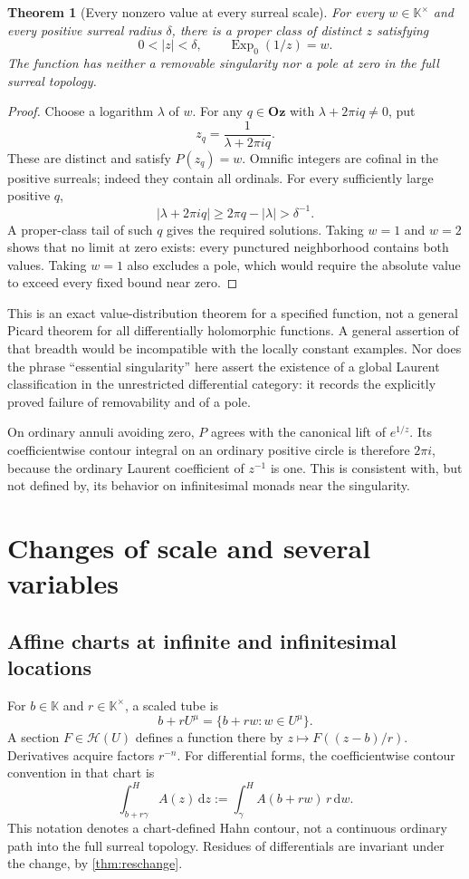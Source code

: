 \documentclass[11pt,oneside]{article}
\numberwithin{equation}{section}
\newtheorem{theorem}{Theorem}[section]
\theoremstyle{definition}
\theoremstyle{remark}\newtheorem{remark}[theorem]{Remark}
\newcommand{\Oz}{\mathbf{Oz}}
\newcommand{\K}{\mathbb K}
\newcommand{\HH}{\mathscr H}
\newcommand{\Exp}{\operatorname{Exp}}
\newcommand{\hint}{\mathop{\int}\nolimits^{\!H}}
\newcommand{\dd}{\,\mathrm d}
\begin{document}
\begin{theorem}[Every nonzero value at every surreal scale]\label{thm:picard}
For every $w\in\K^\times$ and every positive surreal radius $\delta$,
there is a proper class of distinct $z$ satisfying
\[
 0<|z|<\delta,\qquad \Exp_0(1/z)=w.
\]
The function has neither a removable singularity nor a pole at zero in
the full surreal topology.
\end{theorem}
\begin{proof}
Choose a logarithm $\lambda$ of $w$. For any $q\in\Oz$ with
$\lambda+2\pi iq\ne0$, put
\[
 z_q=\frac1{\lambda+2\pi iq}.
\]
These are distinct and satisfy $P(z_q)=w$. Omnific integers are cofinal
in the positive surreals; indeed they contain all ordinals. For every
sufficiently large positive $q$,
\[
 |\lambda+2\pi iq|\geq2\pi q-|\lambda|>\delta^{-1}.
\]
A proper-class tail of such $q$ gives the required solutions.
Taking $w=1$ and $w=2$ shows that no limit at zero exists: every punctured
neighborhood contains both values. Taking $w=1$ also excludes a pole,
which would require the absolute value to exceed every fixed bound near
zero.
\end{proof}
This is an exact value-distribution theorem for a specified function,
not a general Picard theorem for all differentially holomorphic functions.
A general assertion of that breadth would be incompatible with the
locally constant examples. Nor does the phrase ``essential singularity''
here assert the existence of a global Laurent classification in the
unrestricted differential category: it records the explicitly proved
failure of removability and of a pole.

On ordinary annuli avoiding zero, $P$ agrees with the canonical lift of
$e^{1/z}$. Its coefficientwise contour integral on an ordinary positive
circle is therefore $2\pi i$, because the ordinary Laurent coefficient
of $z^{-1}$ is one. This is consistent with, but not defined by, its
behavior on infinitesimal monads near the singularity.

\section{Changes of scale and several variables}
\subsection{Affine charts at infinite and infinitesimal locations}
For $b\in\K$ and $r\in\K^\times$, a scaled tube is
\[
 b+rU^\mu=\{b+rw:w\in U^\mu\}.
\]
A section $F\in\HH(U)$ defines a function there by $z\mapsto F((z-b)/r)$.
Derivatives acquire factors $r^{-n}$. For differential forms, the
coefficientwise contour convention in that chart is
\[
 \hint_{b+r\gamma} A(z)\dd z
 :=\hint_\gamma A(b+rw)\,r\dd w.
\]
This notation denotes a chart-defined Hahn contour, not a continuous
ordinary path into the full surreal topology. Residues of differentials
are invariant under the change, by \cref{thm:reschange}.
\end{document}
